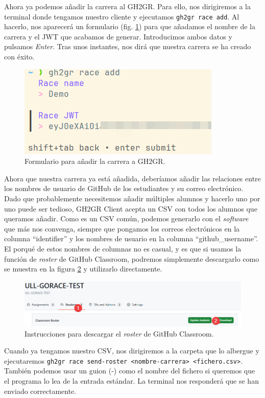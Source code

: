 Ahora ya podemos añadir la carrera al GH2GR. Para ello, nos dirigiremos a la terminal donde tengamos nuestro cliente y ejecutamos \texttt{gh2gr race add}. Al hacerlo, nos aparecerá un formulario (fig. \ref{fig:client-add-race-form}) para que añadamos el nombre de la carrera y el \acrshort{JWT} que acabamos de generar. Introducimos ambos datos y pulsamos \textit{Enter}. Tras unos instantes, nos dirá que nuestra carrera se ha creado con éxito.

\begin{figure}
    \centering
    \includegraphics[width=0.5\linewidth]{images/client-add-race-form.png}
    \caption{Formulario para añadir la carrera a GH2GR.}
    \label{fig:client-add-race-form}
\end{figure}

Ahora que nuestra carrera ya está añadida, deberíamos añadir las relaciones entre los nombres de usuario de GitHub de los estudiantes y su correo electrónico. Dado que probablemente necesitemos añadir múltiples alumnos y hacerlo uno por uno puede ser tedioso, GH2GR Client acepta un \acrshort{CSV} con todos los alumnos que queramos añadir. Como es un \acrshort{CSV} común, podemos generarlo con el \textit{software} que más nos convenga, siempre que pongamos los correos electrónicos en la columna ``identifier'' y los nombres de usuario en la columna ``github\_username''. El porqué de estos nombres de columnas no es casual, y es que si usamos la función de \textit{roster} de GitHub Classroom, podremos simplemente descargarlo como se muestra en la figura \ref{fig:gh-download-roster} y utilizarlo directamente.

\begin{figure}
    \centering
    \includegraphics[width=0.5\linewidth]{images/gh-dowload-roaster.png}
    \caption{Instrucciones para descargar el \textit{roster} de GitHub Classroom.}
    \label{fig:gh-download-roster}
\end{figure}

Cuando ya tengamos nuestro \acrshort{CSV}, nos dirigiremos a la carpeta que lo albergue y ejecutaremos \texttt{gh2gr race send-roster <nombre-carrera> <fichero.csv>}. También podemos usar un guion (-) como el nombre del fichero si queremos que el programa lo lea de la entrada estándar. La terminal nos responderá que se han enviado correctamente.

